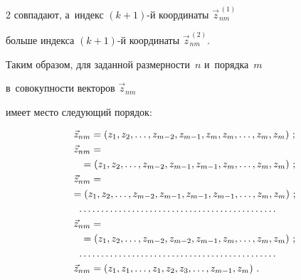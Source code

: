 \begin{multicols}{2}
совпадают, а~индекс $(k+1)$-й координаты ${\vec z}^{\,(1)}_{nm}$


больше индекса $(k+1)$-й координаты ${\vec z}^{\,(2)}_{nm}$.


Таким образом, для заданной размерности~$n$ и~порядка~$m$


в~совокупности векторов ${\vec z}_{nm}$


имеет место следующий порядок:





\noindent


\begin{align*}


{\vec z}_{nm}&=\left(z_1,z_2,\dots,z_{m-2}, z_{m-1}, z_m, z_m, \dots, z_m, z_m\right)\,;


\\


{\vec z}_{nm}&=\\


&\hspace*{-3.5mm}{}=\left(z_1,z_2,\dots,z_{m-2}, z_{m-1}, z_{m-1}, z_m, \dots, z_m, z_m\right)\,;


\\


{\vec z}_{nm}&=\\


&\hspace*{-7mm}{}=\left(z_1,z_2,\dots,z_{m-2}, z_{m-1}, z_{m-1}, z_{m-1}, \dots, z_m, z_m\right)\,;


\\


\dots&  \dots \dots\dots\dots\dots\dots\dots\dots\dots\dots\dots\dots\dots\dots


\\


{\vec z}_{nm}&=\\


&\hspace*{-3.5mm}{}=\left(z_1,z_2,\dots,z_{m-2}, z_{m-2}, z_{m-1}, z_m, \dots, z_m, z_m\right)\,;


\\


\dots&  \dots \dots\dots\dots\dots\dots\dots\dots\dots\dots\dots\dots\dots\dots


\\


{\vec z}_{nm}&=\left(z_1,z_1,\dots,z_{1}, z_{2}, z_3, \dots, z_{m-1}, z_m\right)\,.


\end{align*}



\end{multicols}
